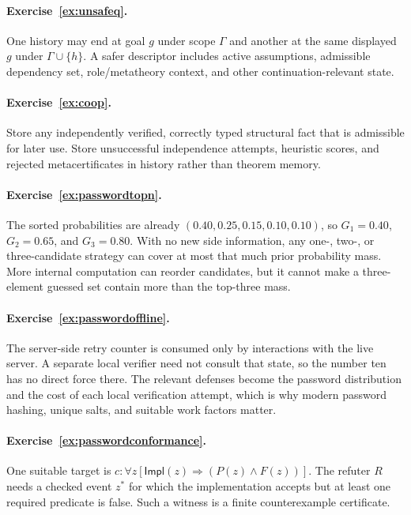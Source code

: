\documentclass[11pt,openany]{book}
\theoremstyle{definition}
\theoremstyle{remark}
\begin{document}
\paragraph{Exercise~\ref{ex:unsafeq}.}
One history may end at goal $g$ under scope $\Gamma$ and another at the same displayed $g$ under $\Gamma\cup\{h\}$. A safer descriptor includes active assumptions, admissible dependency set, role/metatheory context, and other continuation-relevant state.

\paragraph{Exercise~\ref{ex:coop}.}
Store any independently verified, correctly typed structural fact that is admissible for later use. Store unsuccessful independence attempts, heuristic scores, and rejected metacertificates in history rather than theorem memory.


\paragraph{Exercise~\ref{ex:passwordtopn}.}
The sorted probabilities are already $(0.40,0.25,0.15,0.10,0.10)$, so $G_1=0.40$, $G_2=0.65$, and $G_3=0.80$. With no new side information, any one-, two-, or three-candidate strategy can cover at most that much prior probability mass. More internal computation can reorder candidates, but it cannot make a three-element guessed set contain more than the top-three mass.

\paragraph{Exercise~\ref{ex:passwordoffline}.}
The server-side retry counter is consumed only by interactions with the live server. A separate local verifier need not consult that state, so the number ten has no direct force there. The relevant defenses become the password distribution and the cost of each local verification attempt, which is why modern password hashing, unique salts, and suitable work factors matter.

\paragraph{Exercise~\ref{ex:passwordconformance}.}
One suitable target is $c:\forall z[\mathsf{Impl}(z)\Rightarrow(P(z)\wedge F(z))]$. The refuter $R$ needs a checked event $z^*$ for which the implementation accepts but at least one required predicate is false. Such a witness is a finite counterexample certificate.
\end{document}
